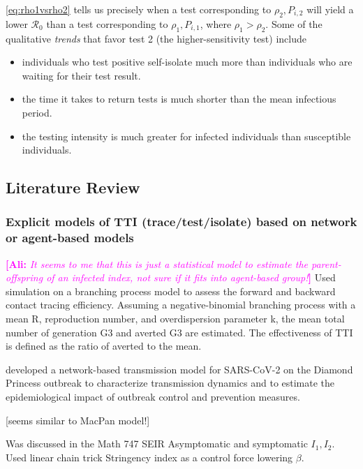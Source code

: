 \documentclass[12pt]{article}
\newcommand{\comment}{\showcomment}
\newcommand{\showcomment}[3]{\textcolor{#1}{\textbf{[#2: }\textsl{#3}\textbf{]}}}
\newcommand{\ali}[1]{\comment{magenta}{Ali}{#1}}
\newcommand{\Rnum}{\mathcal{R}_0}
\theoremstyle{definition} %
\begin{document}
\cref{eq:rho1vsrho2} tells us precisely when a test corresponding to $\rho_2, P_{i,2}$ will yield a lower $\Rnum$ than a test corresponding to $\rho_1, P_{i,1}$, where $\rho_1 > \rho_2$. Some of the qualitative \textit{trends} that favor test 2 (the higher-sensitivity test) include

\begin{itemize}
    \item individuals who test positive self-isolate much more than individuals who are waiting for their test result.
    \item the time it takes to return tests is much shorter than the mean infectious period.
    \item the testing intensity is much greater for infected individuals than susceptible individuals.
\end{itemize}


\subsection{Literature Review}

\subsubsection{Explicit models of TTI (trace/test/isolate) based on network or agent-based models}
\citep{endo2020implication} \ali{It seems to me that this is just a statistical model to estimate the parent-offspring of an infected index, not sure if it fits into agent-based group!} Used simulation on a branching process model to assess the forward and backward contact tracing efficiency. Assuming a negative-binomial branching process with a mean R, reproduction number, and overdispersion parameter k, the mean total number of generation G3 and averted G3 are estimated. The effectiveness of TTI is defined as the ratio of averted to the mean.

\citep{jenness2020modeling} developed a network-based transmission model for SARS-CoV-2 on the Diamond Princess outbreak to characterize transmission dynamics and to estimate the epidemiological impact of outbreak control and prevention measures. 

\citep{elbanna2020entry} [seems similar to MacPan model!]

\citep{de2020influenza} Was discussed in the Math 747 
SEIR Asymptomatic and symptomatic $I_1, I_2$. Used linear chain trick 
Stringency index as a control force lowering $\beta$.
\end{document}
